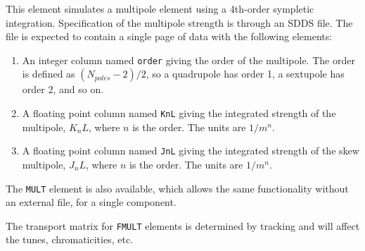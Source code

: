 \begin{raggedright}
This element simulates a multipole element using a 4th-order sympletic
integration.  
Specification of the multipole strength is through an SDDS file.
The file is expected to contain a single page of
data with the following elements:
\end{raggedright}
\begin{enumerate}
\item An integer column named {\tt order} giving the order of the multipole.
The order is defined as $(N_{poles}-2)/2$, so a quadrupole has order 1, a
sextupole has order 2, and so on.
\item A floating point column named {\tt KnL} giving the integrated strength of
the multipole, $K_n L$, where $n$ is the order.  The units are $1/m^n$.
\item A floating point column named {\tt JnL} giving the integrated strength of
the skew multipole, $J_n L$, where $n$ is the order.  The units are $1/m^n$.
\end{enumerate}

The {\tt MULT} element is also available, which allows the same functionality without an external file,
for a single component.

The transport matrix for {\tt FMULT} elements is determined by tracking and will affect the
tunes, chromaticities, etc.


